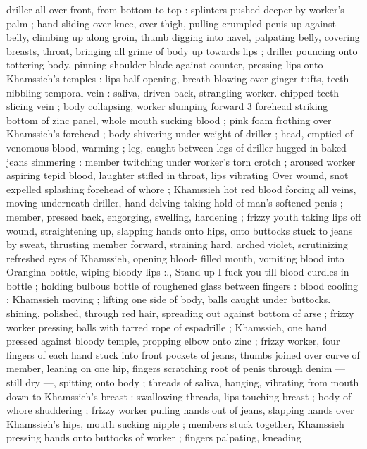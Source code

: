 driller all over front, from bottom to top : splinters pushed deeper by 
worker's palm ; hand sliding over knee, over thigh, pulling crumpled 
penis up against belly, climbing up along groin, thumb digging into 
navel, palpating belly, covering breasts, throat, bringing all grime of 
body up towards lips ; driller pouncing onto tottering body, pinning 
shoulder-blade against counter, pressing lips onto Khamssieh's 
temples : lips half-opening, breath blowing over ginger tufts, teeth 
nibbling temporal vein : saliva, driven back, strangling worker. 
chipped teeth slicing vein ; body collapsing, worker slumping forward 
3 forehead striking bottom of zinc panel, whole mouth sucking blood 
; pink foam frothing over Khamssieh's forehead ; body shivering 
under weight of driller ; head, emptied of venomous blood, warming 
; leg, caught between legs of driller hugged in baked jeans 
simmering : member twitching under worker's torn crotch ; aroused 
worker aspiring tepid blood, laughter stifled in throat, lips vibrating 
Over wound, snot expelled splashing forehead of whore ; Khamssieh 
hot red blood forcing all veins, moving underneath driller, hand 
delving taking hold of man's softened penis ; member, pressed back, 
engorging, swelling, hardening ; frizzy youth taking lips off wound, 
straightening up, slapping hands onto hips, onto buttocks stuck to 
jeans by sweat, thrusting member forward, straining hard, arched 
violet, scrutinizing refreshed eyes of Khamssieh, opening blood- 
filled mouth, vomiting blood into Orangina bottle, wiping bloody lips 
:{\gl}., Stand up{\td} I fuck you till blood curdles in bottle{\thd} ; holding 
bulbous bottle of roughened glass between fingers : blood cooling ; 
Khamssieh moving ; lifting one side of body, balls caught under 
buttocks. shining, polished, through red hair, spreading out against 
bottom of arse ; frizzy worker pressing balls with tarred rope of 
espadrille ; Khamssieh, one hand pressed against bloody temple, 
propping elbow onto zinc ; frizzy worker, four fingers of each hand 
stuck into front pockets of jeans, thumbs joined over curve of 
member, leaning on one hip, fingers scratching root of penis through 
denim --- still dry ---, spitting onto body ; threads of saliva, hanging, 
vibrating from mouth down to Khamssieh's breast : swallowing 
threads, lips touching breast ; body of whore shuddering ; frizzy 
worker pulling hands out of jeans, slapping hands over Khamssieh's 
hips, mouth sucking nipple ; members stuck together, Khamssieh 
pressing hands onto buttocks of worker ; fingers palpating, kneading 
